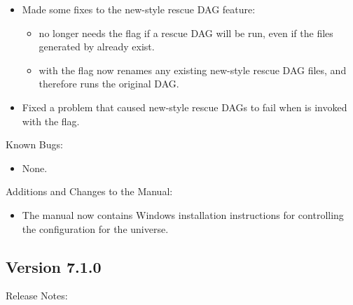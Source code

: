 \begin{itemize}
\item Made some fixes to the new-style rescue DAG feature:
\begin{itemize}
\item {} no longer needs the  flag if a rescue
DAG will be run, even if the files generated by 
already exist.
\item {} with the  flag now renames any
existing new-style rescue DAG files, and therefore runs the original DAG.
\end{itemize}

\item Fixed a problem that caused new-style rescue DAGs to fail when
 is invoked with the  flag.

\end{itemize}

\noindent Known Bugs:

\begin{itemize}

\item None.

\end{itemize}

\noindent Additions and Changes to the Manual:

\begin{itemize}

\item The manual now contains Windows installation instructions for
  controlling the configuration for the  universe.

\end{itemize}



\subsection*{\label{sec:New-7-1-0}Version 7.1.0}

\noindent Release Notes:

